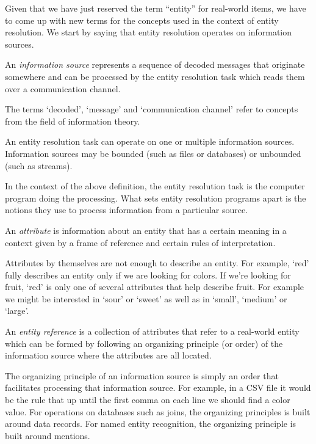 \documentclass[11pt]{article}
\begin{document}
    Given that we have just reserved the term ``entity'' for real-world items,
    we have to come up with new terms for the concepts used in the context of
    entity resolution.
    We start by saying that entity resolution operates on information sources.

    \begin{defn}
        An \textit{information source} represents a sequence of decoded messages
        that originate somewhere and can be processed by the entity resolution
        task which reads them over a communication channel.
    \end{defn}

    The terms `decoded', `message' and `communication channel' refer to concepts
    from the field of information theory\cite{ash2012it}.
    
    An entity resolution task can operate on one or multiple information
    sources.
    Information sources may be bounded (such as files or databases) or unbounded
    (such as streams).
    
    In the context of the above definition, the entity resolution task is the
    computer program doing the processing.
    What sets entity resolution programs apart is the notions they use to
    process information from a particular source.

    \begin{defn}
        An \textit{attribute} is information about an entity that has a certain
        meaning in a context given by a frame of reference and certain rules of
        interpretation.
    \end{defn}

    Attributes by themselves are not enough to describe an entity.
    For example, `red' fully describes an entity only if we are looking for
    colors.
    If we're looking for fruit, `red' is only one of several attributes that
    help describe fruit.
    For example we might be interested in `sour' or `sweet' as well as in
    `small', `medium' or `large'.

    \begin{defn}
        An \textit{entity reference} is a collection of attributes that refer
        to a real-world entity which can be formed by following an organizing
        principle (or order) of the information source where the attributes are
        all located.
    \end{defn}

    The organizing principle of an information source is simply an order that
    facilitates processing that information source.
    For example, in a CSV file it would be the rule that up until the first
    comma on each line we should find a color value.
    For operations on databases such as joins, the organizing principles is
    built around data records.
    For named entity recognition, the organizing principle is built around
    mentions.
\end{document}
